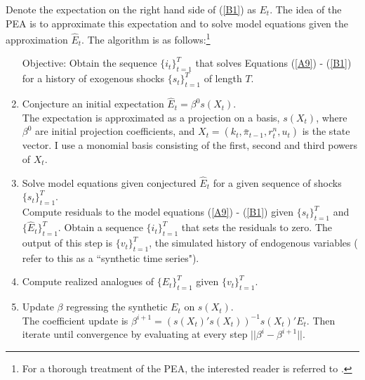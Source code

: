 \documentclass[11pt]{article}
\renewcommand{\[}{\begin{equation}}
\renewcommand{\]}{\end{equation}}
\begin{document}
Denote the expectation on the right hand side of (\ref{B1}) as $E_t$. The idea of the PEA is to approximate this expectation and to solve model equations given the approximation $\hat{E}_t$. The algorithm is as follows:\footnote{For a thorough treatment of the PEA, the interested reader is referred to \cite{christiano2000occasionally}.}
\begin{enumerate}
\item[Objective:] Obtain the sequence $\{i_t\}_{t=1}^T$ that solves Equations (\ref{A9}) - (\ref{B1}) for a history of exogenous shocks $\{s_t\}_{t=1}^T$ of length $T$. 
\item Conjecture an initial expectation $\hat{E}_t=\beta^0 s(X_t)$. \\
The expectation is approximated as a projection on a basis, $s(X_t)$, where $\beta^0$ are initial projection coefficients, and $X_t = (k_t,\bar{\pi}_{t-1}, r^n_t, u_t)$ is the state vector. I use a monomial basis consisting of the first, second and third powers of $X_t$.
\item Solve model equations given conjectured $\hat{E}_t$ for a given sequence of shocks $\{s_t\}_{t=1}^T$.\\
Compute residuals to the model equations (\ref{A9}) - (\ref{B1}) given $\{s_t\}_{t=1}^T$ and $\{\hat{E}_t\}_{t=1}^T$. Obtain a sequence $\{i_t\}_{t=1}^T$ that sets the residuals to zero. The output of this step is $\{v_t\}_{t=1}^T$, the simulated history of endogenous variables (\cite{christiano2000occasionally} refer to this as a ``synthetic time series"). 
\item Compute realized analogues of $\{E_t\}_{t=1}^T$ given $\{v_t\}_{t=1}^T$.
\item Update $\beta$ regressing the synthetic $E_t$ on $s(X_t)$.\\
The coefficient update is $\beta^{i+1} = (s(X_t)'s(X_t))^{-1}s(X_t)'E_t$. Then iterate until convergence by evaluating at every step $||\beta^i-\beta^{i+1}||$.
\end{enumerate}
\end{document}
